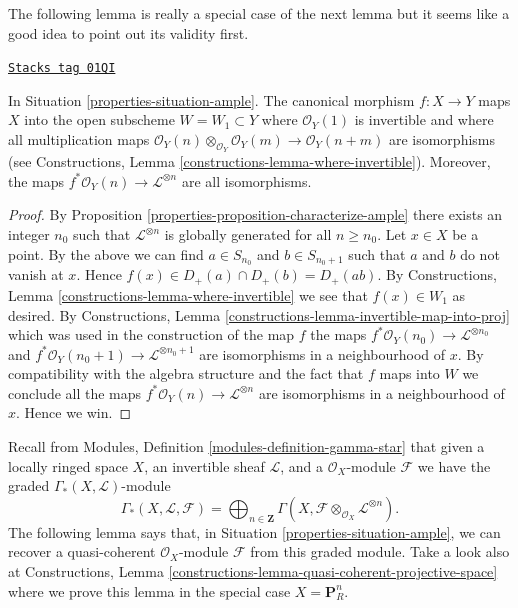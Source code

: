 The following lemma is really a special case of the next lemma
but it seems like a good idea to point out its validity first.

\begin{lemma}
\label{properties-lemma-ample-gcd-is-one}
\href{https://stacks.math.columbia.edu/tag/01QI}{\texttt{Stacks tag 01QI}}

In Situation \ref{properties-situation-ample}.
The canonical morphism $f : X \to Y$
maps $X$ into the open subscheme $W = W_1 \subset Y$
where $\mathcal{O}_Y(1)$ is invertible and where
all multiplication maps
$\mathcal{O}_Y(n) \otimes_{\mathcal{O}_Y} \mathcal{O}_Y(m) \to
\mathcal{O}_Y(n + m)$
are isomorphisms (see
Constructions, Lemma \ref{constructions-lemma-where-invertible}).
Moreover, the maps $f^*\mathcal{O}_Y(n) \to \mathcal{L}^{\otimes n}$
are all isomorphisms.
\end{lemma}

\begin{proof}

By Proposition \ref{properties-proposition-characterize-ample} there exists an integer
$n_0$ such that $\mathcal{L}^{\otimes n}$ is globally generated for all
$n \geq n_0$. Let $x \in X$ be a point. By the above we can find
$a \in S_{n_0}$ and $b \in S_{n_0 + 1}$ such that
$a$ and $b$ do not vanish at $x$. Hence
$f(x) \in D_{+}(a) \cap D_{+}(b) = D_{+}(ab)$. By
Constructions, Lemma \ref{constructions-lemma-where-invertible}
we see that $f(x) \in W_1$ as desired. By
Constructions, Lemma \ref{constructions-lemma-invertible-map-into-proj}
which was used in the construction of the map $f$
the maps
$f^*\mathcal{O}_Y(n_0) \to \mathcal{L}^{\otimes n_0}$ and
$f^*\mathcal{O}_Y(n_0 + 1) \to \mathcal{L}^{\otimes n_0 + 1}$
are isomorphisms in a neighbourhood of $x$. By compatibility with
the algebra structure and the fact that $f$ maps into $W$
we conclude all the maps
$f^*\mathcal{O}_Y(n) \to \mathcal{L}^{\otimes n}$ are isomorphisms
in a neighbourhood of $x$. Hence we win.
\end{proof}

Recall from Modules, Definition \ref{modules-definition-gamma-star}
that given a locally ringed space $X$, an invertible sheaf $\mathcal{L}$,
and a $\mathcal{O}_X$-module $\mathcal{F}$ we have the graded
$\Gamma_*(X, \mathcal{L})$-module
$$
\Gamma_*(X, \mathcal{L}, \mathcal{F}) =
\bigoplus\nolimits_{n \in \mathbf{Z}}
\Gamma(X, \mathcal{F} \otimes_{\mathcal{O}_X} \mathcal{L}^{\otimes n}).
$$
The following lemma says that, in Situation \ref{properties-situation-ample},
we can recover a quasi-coherent $\mathcal{O}_X$-module $\mathcal{F}$
from this graded module. Take a look also at
Constructions, Lemma \ref{constructions-lemma-quasi-coherent-projective-space}
where we prove this lemma in the special case $X = \mathbf{P}^n_R$.

